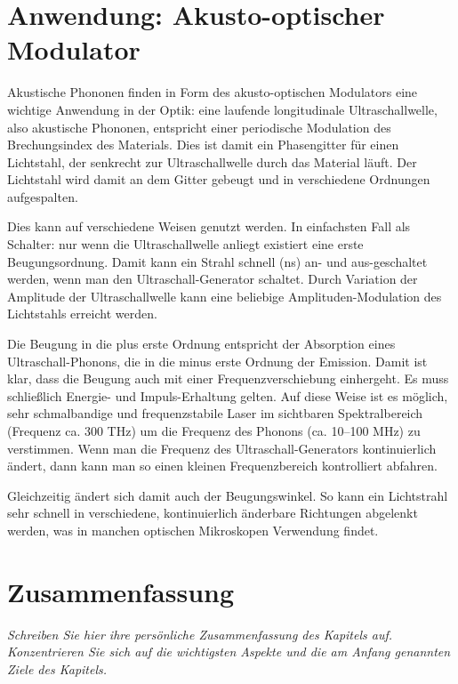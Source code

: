 \section{Anwendung: Akusto-optischer Modulator}

Akustische Phononen finden in Form des  akusto-optischen Modulators eine wichtige Anwendung in der Optik: eine laufende longitudinale Ultraschallwelle, also akustische Phononen, entspricht einer periodische Modulation des Brechungsindex des Materials. Dies ist damit ein Phasengitter für einen Lichtstahl, der senkrecht zur Ultraschallwelle durch das Material läuft. Der Lichtstahl wird damit an dem Gitter gebeugt und in verschiedene Ordnungen aufgespalten.

Dies kann auf verschiedene Weisen genutzt werden. In einfachsten Fall als Schalter: nur wenn die Ultraschallwelle anliegt existiert eine erste Beugungsordnung. Damit kann ein Strahl schnell (ns) an- und aus-geschaltet werden, wenn man den Ultraschall-Generator schaltet. Durch Variation der Amplitude der Ultraschallwelle kann eine beliebige Amplituden-Modulation des Lichtstahls erreicht werden.

Die Beugung in die plus erste Ordnung entspricht der Absorption eines Ultraschall-Phonons, die in die minus erste Ordnung der Emission. Damit ist klar, dass die Beugung auch mit einer Frequenzverschiebung einhergeht. Es muss schließlich Energie- und Impuls-Erhaltung gelten. Auf diese Weise ist es möglich, sehr schmalbandige und frequenzstabile Laser im sichtbaren Spektralbereich (Frequenz ca. 300 THz) um die Frequenz des Phonons (ca. 10--100 MHz) zu verstimmen. Wenn man die Frequenz des  Ultraschall-Generators kontinuierlich ändert, dann kann man so einen kleinen Frequenzbereich kontrolliert abfahren.

Gleichzeitig ändert sich damit auch der Beugungswinkel. So kann ein Lichtstrahl sehr schnell in verschiedene, kontinuierlich änderbare Richtungen abgelenkt werden, was in manchen optischen Mikroskopen Verwendung findet.


\section{Zusammenfassung}

\textit{Schreiben Sie hier ihre persönliche Zusammenfassung des Kapitels auf. Konzentrieren Sie sich auf die wichtigsten Aspekte und die am Anfang genannten Ziele des Kapitels.}

\vspace*{10cm}





\printbibliography[segment=\therefsegment,heading=subbibliography]
